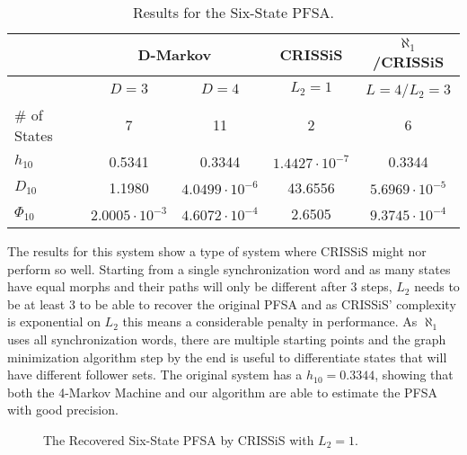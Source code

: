 {\begin{table}
\centering
\caption{Results for the Six-State PFSA. \label{tab:sixstate}}
\begin{tabular}{|l|c|c|c|c|}
\hline
 & \multicolumn{2}{c|}{\textbf{D-Markov}} & \textbf{CRISSiS} & \textbf{$\aleph_1$/CRISSiS} \\
 \hline
 & $D=3$ & $D=4$ & $L_2=1$& $L=4$/$L_2=3$ \\
\hline
\# of States & 7 & 11 & 2 & 6 \\ 
$h_{10}$ & 0.5341 & 0.3344 & $1.4427\cdot 10^{-7}$ & 0.3344 \\
$D_{10}$ & 1.1980 & $4.0499\cdot 10^{-6}$ &  43.6556 & $5.6969\cdot10^{-5}$ \\
$\Phi_{10}$ & $2.0005\cdot 10^{-3}$ & $4.6072\cdot 10^{-4}$ & 2.6505 & $9.3745\cdot10^{-4}$ \\
 \hline
\end{tabular}
\end{table}

The results for this system show a type of system where CRISSiS might nor perform so well. Starting from a single synchronization word and as many states have equal morphs and their paths will only be different after 3 steps, $L_2$ needs to be at least 3 to be able to recover the original PFSA and as CRISSiS' complexity is exponential on $L_2$ this means a considerable penalty in performance. As $\aleph_1$ uses all synchronization words, there are multiple starting points and the graph minimization algorithm step by the end is useful to differentiate states that will have different follower sets. The original system has a $h_{10} = 0.3344$, showing that both the 4-Markov Machine and our algorithm are able to estimate the PFSA with good precision.

\begin{figure}
\centering
{}
\caption{The Recovered Six-State PFSA by CRISSiS with $L_2 = 1$.\label{fig:sixstatecrissis}}
\end{figure}

}
